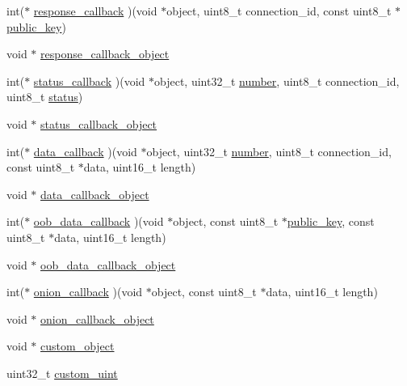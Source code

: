 \begin{DoxyCompactItemize}
\begin{tabbing}
\end{tabbing}\item 
int($\ast$ \hyperlink{struct_t_c_p___client___connection_ab32747bc59a98c0c7127293859eccb85}{response\+\_\+callback} )(void $\ast$object, uint8\+\_\+t connection\+\_\+id, const uint8\+\_\+t $\ast$\hyperlink{struct_t_c_p___client___connection_aaa806bb1136fb3d4b5d8d8970b596ff7}{public\+\_\+key})
\item 
void $\ast$ \hyperlink{struct_t_c_p___client___connection_a60ca473249fab46aefe6f89158bd5a52}{response\+\_\+callback\+\_\+object}
\item 
int($\ast$ \hyperlink{struct_t_c_p___client___connection_a8c56af2094f8d2846998b395dbcaef18}{status\+\_\+callback} )(void $\ast$object, uint32\+\_\+t \hyperlink{struct_t_c_p___client___connection_ad50c630d233a71112a7df136970caefc}{number}, uint8\+\_\+t connection\+\_\+id, uint8\+\_\+t \hyperlink{struct_t_c_p___client___connection_ade818037fd6c985038ff29656089758d}{status})
\item 
void $\ast$ \hyperlink{struct_t_c_p___client___connection_a73f125475af5ebdac27d2c2a9060039b}{status\+\_\+callback\+\_\+object}
\item 
int($\ast$ \hyperlink{struct_t_c_p___client___connection_a2da80454e9a05921b2c6616ffb021eec}{data\+\_\+callback} )(void $\ast$object, uint32\+\_\+t \hyperlink{struct_t_c_p___client___connection_ad50c630d233a71112a7df136970caefc}{number}, uint8\+\_\+t connection\+\_\+id, const uint8\+\_\+t $\ast$data, uint16\+\_\+t length)
\item 
void $\ast$ \hyperlink{struct_t_c_p___client___connection_a9135a1782241a1b2d5e9bcedef0c29a5}{data\+\_\+callback\+\_\+object}
\item 
int($\ast$ \hyperlink{struct_t_c_p___client___connection_a3f8394ec4439b5730e80f10d6951b845}{oob\+\_\+data\+\_\+callback} )(void $\ast$object, const uint8\+\_\+t $\ast$\hyperlink{struct_t_c_p___client___connection_aaa806bb1136fb3d4b5d8d8970b596ff7}{public\+\_\+key}, const uint8\+\_\+t $\ast$data, uint16\+\_\+t length)
\item 
void $\ast$ \hyperlink{struct_t_c_p___client___connection_a3bd56ba2917797a0eea802a7192ef031}{oob\+\_\+data\+\_\+callback\+\_\+object}
\item 
int($\ast$ \hyperlink{struct_t_c_p___client___connection_ab6dd4883cc217ef4c036cb404f036a47}{onion\+\_\+callback} )(void $\ast$object, const uint8\+\_\+t $\ast$data, uint16\+\_\+t length)
\item 
void $\ast$ \hyperlink{struct_t_c_p___client___connection_a975f7347f9eee77bcd1eb36b5e913021}{onion\+\_\+callback\+\_\+object}
\item 
void $\ast$ \hyperlink{struct_t_c_p___client___connection_a5166a2d34403f1dafd1f23602df6c759}{custom\+\_\+object}
\item 
uint32\+\_\+t \hyperlink{struct_t_c_p___client___connection_a1f84a5213a1e59db55448dd696113bfc}{custom\+\_\+uint}
\end{DoxyCompactItemize}


